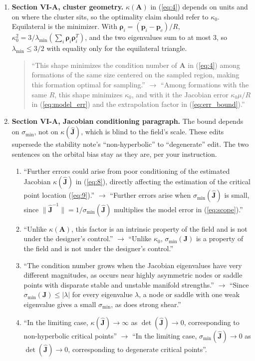 \documentclass[10pt]{article}
\begin{document}
\begin{enumerate}
\item \textbf{Section VI-A, cluster geometry.} $\kappa(\mathbf{A})$ in (\ref{eq:4}) depends on units and on where the cluster sits, so the optimality claim should refer to $\kappa_0$. Equilateral is the minimizer. With $\boldsymbol{\rho}_i = (\mathbf{p}_i - \mathbf{p}_c)/R$, $\kappa_0^2 = 3/\lambda_{\min}(\sum_i\boldsymbol{\rho}_i\boldsymbol{\rho}_i^T)$, and the two eigenvalues sum to at most 3, so $\lambda_{\min} \le 3/2$ with equality only for the equilateral triangle.
\begin{quote}
``This shape minimizes the condition number of $\mathbf{A}$ in (\ref{eq:4}) among formations of the same size centered on the sampled region, making this formation optimal for sampling.'' $\to$ ``Among formations with the same $R$, this shape minimizes $\kappa_0$, and with it the Jacobian error $\kappa_0\mu/R$ in (\ref{eq:model_err}) and the extrapolation factor in (\ref{eq:err_bound}).''
\end{quote}

\item \textbf{Section VI-A, Jacobian conditioning paragraph.} The bound depends on $\sigma_{\min}$, not on $\kappa(\hat{\mathbf{J}})$, which is blind to the field's scale. These edits supersede the stability note's ``non-hyperbolic'' to ``degenerate'' edit. The two sentences on the orbital bias stay as they are, per your instruction.
\begin{enumerate}
\item ``Further errors could arise from poor conditioning of the estimated Jacobian $\kappa(\hat{\mathbf{J}})$ in (\ref{eq:8}), directly affecting the estimation of the critical point location (\ref{eq:9}).'' $\to$ ``Further errors arise when $\sigma_{\min}(\hat{\mathbf{J}})$ is small, since $\|\hat{\mathbf{J}}^{-1}\| = 1/\sigma_{\min}(\hat{\mathbf{J}})$ multiplies the model error in (\ref{eq:scope}).''
\item ``Unlike $\kappa(\mathbf{A})$, this factor is an intrinsic property of the field and is not under the designer's control.'' $\to$ ``Unlike $\kappa_0$, $\sigma_{\min}(\mathbf{J})$ is a property of the field and is not under the designer's control.''
\item ``The condition number grows when the Jacobian eigenvalues have very different magnitudes, as occurs near highly asymmetric nodes or saddle points with disparate stable and unstable manifold strengths.'' $\to$ ``Since $\sigma_{\min}(\mathbf{J}) \le |\lambda|$ for every eigenvalue $\lambda$, a node or saddle with one weak eigenvalue gives a small $\sigma_{\min}$, as does strong shear.''
\item ``In the limiting case, $\kappa(\hat{\mathbf{J}}) \to \infty$ as $\det(\hat{\mathbf{J}}) \to 0$, corresponding to non-hyperbolic critical points'' $\to$ ``In the limiting case, $\sigma_{\min}(\hat{\mathbf{J}}) \to 0$ as $\det(\hat{\mathbf{J}}) \to 0$, corresponding to degenerate critical points''.
\end{enumerate}


\end{enumerate}
\end{document}
